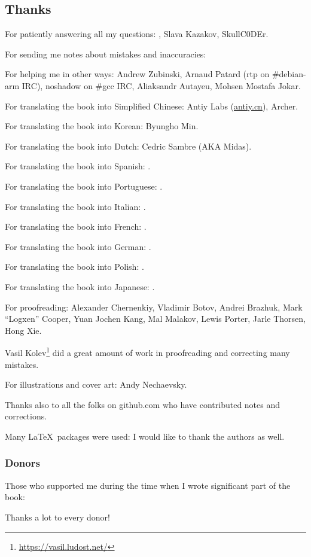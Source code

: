 \subsection*{Thanks}

For patiently answering all my questions: \HERMIT, Slava  Kazakov, SkullC0DEr.

For sending me notes about mistakes and inaccuracies: \PeopleMistakesInaccuracies{}

For helping me in other ways:
Andrew Zubinski,
Arnaud Patard (rtp on \#debian-arm IRC),
noshadow on \#gcc IRC,
Aliaksandr Autayeu,
Mohsen Mostafa Jokar.

For translating the book into Simplified Chinese:
Antiy Labs (\href{http://antiy.cn}{antiy.cn}), Archer.

For translating the book into Korean: Byungho Min.

For translating the book into Dutch: Cedric Sambre (AKA Midas).

For translating the book into Spanish: \PeopleSpanishTranslators{}.

For translating the book into Portuguese: \PeoplePTBRTranslators{}.

For translating the book into Italian: \PeopleItalianTranslators{}.

For translating the book into French: \PeopleFrenchTranslators{}.

For translating the book into German: \PeopleGermanTranslators{}.

For translating the book into Polish: \PeoplePolishTranslators{}.

For translating the book into Japanese: \PeopleJapaneseTranslators{}.

For proofreading:
Alexander  Chernenkiy,
Vladimir Botov,
Andrei Brazhuk,
Mark ``Logxen'' Cooper, Yuan Jochen Kang, Mal Malakov, Lewis Porter, Jarle Thorsen, Hong Xie.

Vasil Kolev\footnote{\url{https://vasil.ludost.net/}} did a great amount of work in proofreading and correcting many mistakes.

For illustrations and cover art: Andy Nechaevsky.

Thanks also to all the folks on github.com who have contributed notes and corrections\FNGithubContributors{}.

Many \LaTeX\ packages were used: I would like to thank the authors as well.

\subsubsection*{Donors}

Those who supported me during the time when I wrote significant part of the book:



Thanks a lot to every donor!

